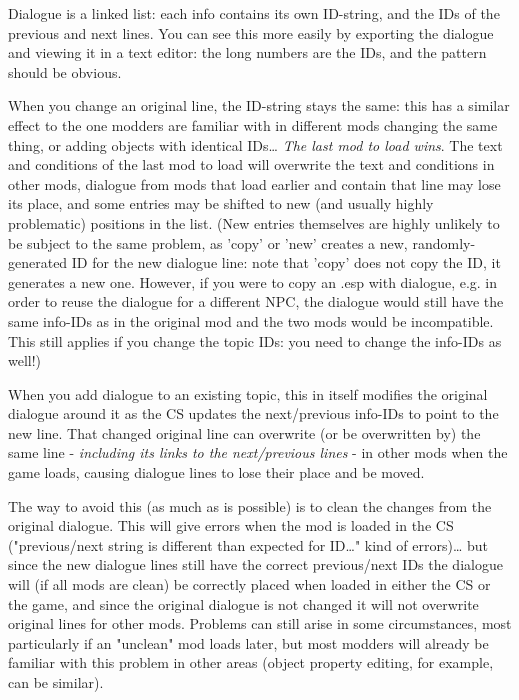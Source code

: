 \documentclass[
]{article}
\begin{document}
Dialogue is a linked list: each info contains its own ID-string, and the
IDs of the previous and next lines. You can see this more easily by
exporting the dialogue and viewing it in a text editor: the long numbers
are the IDs, and the pattern should be obvious.

When you change an original line, the ID-string stays the same: this has
a similar effect to the one modders are familiar with in different mods
changing the same thing, or adding objects with identical IDs\ldots{}
\emph{The last mod to load wins}. The text and conditions of the last
mod to load will overwrite the text and conditions in other mods,
dialogue from mods that load earlier and contain that line may lose its
place, and some entries may be shifted to new (and usually highly
problematic) positions in the list. (New entries themselves are highly
unlikely to be subject to the same problem, as 'copy' or 'new' creates a
new, randomly-generated ID for the new dialogue line: note that 'copy'
does not copy the ID, it generates a new one. However, if you were to
copy an .esp with dialogue, e.g. in order to reuse the dialogue for a
different NPC, the dialogue would still have the same info-IDs as in the
original mod and the two mods would be incompatible. This still applies
if you change the topic IDs: you need to change the info-IDs as well!)

When you add dialogue to an existing topic, this in itself modifies the
original dialogue around it as the CS updates the next/previous info-IDs
to point to the new line. That changed original line can overwrite (or
be overwritten by) the same line - \emph{including its links to the
next/previous lines} - in other mods when the game loads, causing
dialogue lines to lose their place and be moved.

The way to avoid this (as much as is possible) is to clean the changes
from the original dialogue. This will give errors when the mod is loaded
in the CS ("previous/next string is different than expected for
ID\ldots" kind of errors)\ldots{} but since the new dialogue lines still
have the correct previous/next IDs the dialogue will (if all mods are
clean) be correctly placed when loaded in either the CS or the game, and
since the original dialogue is not changed it will not overwrite
original lines for other mods. Problems can still arise in some
circumstances, most particularly if an "unclean" mod loads later, but
most modders will already be familiar with this problem in other areas
(object property editing, for example, can be similar).
\end{document}
